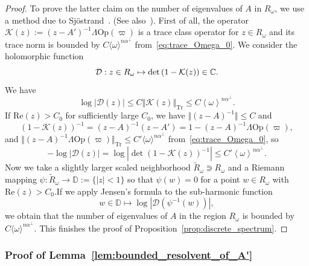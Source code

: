 \documentclass[10pt]{amsart}
\theoremstyle{definition}\newtheorem{defi}[theo]{Definition}\newtheorem{rema}[theo]{Remark}\newtheorem{exam}[theo]{Example}\newtheorem{exem}[theo]{Example}\newtheorem{nota}[theo]{Notation}
\newcommand{\clD}{\mathcal{D}}
\newcommand{\clK}{\mathcal{K}}
\newcommand{\Ree}{\mathrm{Re}}
\newcommand{\Opp}{\mathrm{Op}}
\newcommand{\Tr}{\mathrm{Tr}}
\newcommand{\bbC}{\mathbb{C}}
\newcommand{\bbD}{\mathbb{D}}
\begin{document}
\begin{proof}
To prove the latter claim on the number of eigenvalues of $A$ in $R_{\omega}$, we use a method due to Sj\"ostrand~\cite[Section~4]{sjostrand_2000}. (See also~\cite[Section~8.2]{faure-tsujii_prequantum_maps_12}). First of all, the operator $\clK(z):=(z-A')^{-1}\Lambda\Opp (\varpi)$ is a trace class operator for $z\in R_{\omega}$ and its trace norm is bounded by $C\langle \omega\rangle ^{n\alpha^{\perp}}$ from~\eqref{eq:trace_Omega_0}. We consider the holomorphic function
\[
\text{\ensuremath{\clD}}:z\in R_{\omega}\mapsto\det\left(1-\clK(z)\right)\in\bbC.
\]
We have
\[
\log|\ensuremath{\clD}(z)|\le C\left\Vert \clK(z)\right\Vert _{\Tr}\le C\left\langle \omega\right\rangle ^{n\alpha^{\perp}}.
\]
If $\Ree(z)>C_{0}$ for sufficiently large $C_{0}$, we have $\Vert (z-A)^{-1}\Vert \le C$ and
\[
\left(1-\clK(z)\right)^{-1}=\left(z-A\right)^{-1}\left(z-A'\right)=1-\left(z-A\right)^{-1}\Lambda\Opp \left(\varpi\right),
\]
and $\Vert (z-A)^{-1}\Lambda\Opp (\varpi)\Vert _{\Tr}\le C'\langle \omega\rangle ^{n\alpha^{\perp}}$ from~\eqref{eq:trace_Omega_0}, so
\[
-\log\left|\ensuremath{\clD}\left(z\right)\right|=\log\left|\det \left(1-\clK(z)\right)^{-1}\right|\le C'\left\langle \omega\right\rangle ^{n\alpha^{\perp}}.
\]
Now we take a slightly larger scaled neighborhood $\widetilde{R}_{\omega}\Supset R_{\omega}$ and a Riemann mapping $\psi:\widetilde{R}_{\omega}\to\bbD:=\{|z|<1\}$ so that $\psi(w)=0$ for a point $w\in R_{\omega}$ with $\Ree(z)>C_{0}$.\linebreak If we apply Jensen's formula to the sub-harmonic function
\[
w\in\bbD\mapsto\log|\ensuremath{\clD}(\psi^{-1}(w))|,
\]
we obtain that the number of eigenvalues of $A$ in the region $R_{\omega}$ is bounded by $C\langle \omega\rangle^{n\alpha^{\perp}}$. This finishes the proof of Proposition~\ref{prop:discrete_spectrum}.
\end{proof}

\subsubsection{Proof of Lemma~\ref{lem:bounded_resolvent_of_A'}}\label{subsec:Proof-of-Lemma-1}
\end{document}
